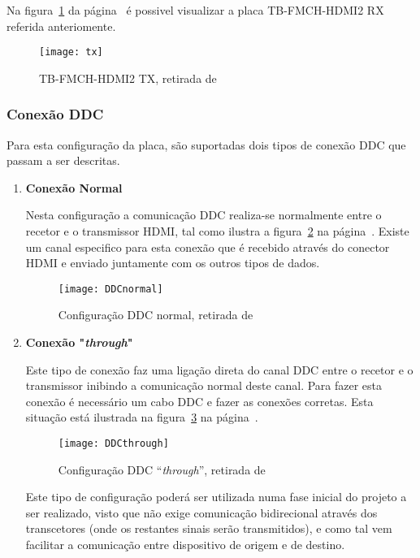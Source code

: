 Na figura~\ref{fig:tx} da página~\pageref{fig:tx} é possivel visualizar a placa TB-FMCH-HDMI2 RX referida anteriomente.
\begin{figure}[h!]
	\begin{center}
		\leavevmode
		\texttt{[image: tx]}
		\caption{TB-FMCH-HDMI2 TX, retirada de \cite{R009}}
		\label{fig:tx}
	\end{center}
\end{figure}

\subsubsection{Conexão DDC}\label{subsubsec:DDCconexao} 

Para esta configuração da placa, são suportadas dois tipos de conexão DDC que passam a ser descritas.

\begin{enumerate}
	\item \textbf{Conexão Normal}
	
	\hspace{1.0em}Nesta configuração a comunicação DDC realiza-se normalmente entre o recetor e o transmissor HDMI, tal como ilustra a figura~\ref{fig:DDCnormal} na página~\pageref{fig:DDCnormal}. Existe um canal especifico para esta conexão que é recebido através do conector HDMI e enviado juntamente com os outros tipos de dados.

	\begin{figure}[h!]
		\begin{center}
			\leavevmode
			\texttt{[image: DDCnormal]}
			\caption{Configuração DDC normal, retirada de \cite{R009}}
			\label{fig:DDCnormal}
		\end{center}
	\end{figure}
	
	\item \textbf{Conexão "\textit{through}"}
	
	\hspace{1.0em}Este tipo de conexão faz uma ligação direta do canal DDC entre o recetor e o transmissor inibindo a comunicação normal deste canal. Para fazer esta conexão é necessário um cabo DDC e fazer as conexões corretas. Esta situação está ilustrada na figura~\ref{fig:DDCthrough} na página~\pageref{fig:DDCthrough}.
	
		\begin{figure}[h!]
		\begin{center}
			\leavevmode
			\texttt{[image: DDCthrough]}
			\caption{Configuração DDC “\textit{through}”, retirada de \cite{R009}}
			\label{fig:DDCthrough}
		\end{center}
	\end{figure}
	
	\hspace{1.0em}Este tipo de configuração poderá ser utilizada numa fase inicial do projeto a ser realizado, visto que não exige comunicação bidirecional através dos transcetores (onde os restantes sinais serão transmitidos), e como tal vem facilitar a comunicação entre dispositivo de origem e de destino.
\end{enumerate}

